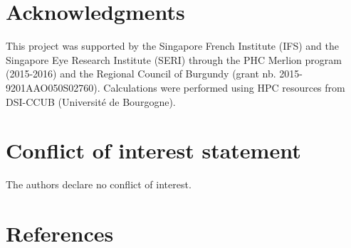 \documentclass[review]{elsarticle}
\begin{document}
\maketitle

\linenumbers
\acresetall %







\section*{Acknowledgments}\label{sec:acknowledgements}

This project was supported by the Singapore French Institute (IFS) and the Singapore Eye Research Institute (SERI) through the PHC Merlion program (2015-2016) and the Regional Council of Burgundy (grant nb. 2015-9201AAO050S02760).
Calculations were performed using HPC resources from DSI-CCUB (Universit\'e de Bourgogne).

\section*{Conflict of interest statement}

The authors declare no conflict of interest.



\section*{References}
\end{document}

